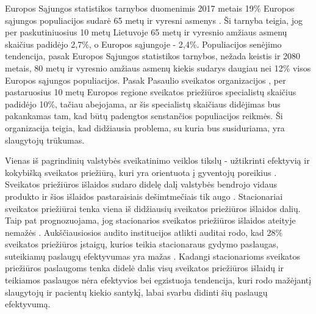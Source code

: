 
Europos Sąjungos statistikos tarnybos duomenimis 2017 metais 19\% Europos sąjungos populiacijos sudarė 65 metų ir vyresni asmenys \cite{Eurostat}. Ši tarnyba teigia, jog per paskutiniuosius 10 metų Lietuvoje 65 metų ir vyresnio amžiaus asmenų skaičius padidėjo 2,7\%, o Europos sąjungoje - 2,4\%. Populiacijos senėjimo tendencija, pasak Europos Sąjungos statistikos tarnybos, nežada keistis ir 2080 metais, 80 metų ir vyresnio amžiaus asmenų kiekis sudarys daugiau nei 12\% visos Europos sąjungos populiacijos. Pasak Pasaulio sveikatos organizacijos \cite{Organization2012}, per pastaruosius 10 metų Europos regione sveikatos priežiūros specialistų skaičius padidėjo 10\%, tačiau abejojama, ar šis specialistų skaičiaus didėjimas bus pakankamas tam, kad būtų padengtos senstančios populiacijos reikmės. Ši organizacija teigia, kad didžiausia problema, su kuria bus susiduriama, yra slaugytojų trūkumas.

Vienas iš pagrindinių valstybės sveikatinimo veiklos tikslų - užtikrinti efektyvią ir kokybišką sveikatos priežiūrą, kuri yra orientuota į gyventojų poreikius \cite{Ataskaita2018}. Sveikatos priežiūros išlaidos sudaro didelę dalį valstybės bendrojo vidaus produkto ir šios išlaidos pastaraisiais dešimtmečiais tik augo \cite{higiena}. Stacionariai sveikatos priežiūrai tenka viena iš didžiausių sveikatos priežiūros išlaidos dalių. Taip pat prognozuojama, jog stacionarios sveikatos priežiūros išlaidos ateityje nemažės \cite{higiena}. Aukščiausiosios audito institucijos atlikti auditai rodo, kad 28\% sveikatos priežiūros įstaigų, kurios teikia stacionaraus gydymo paslaugas, suteikiamų paslaugų efektyvumas yra mažas \cite{Ataskaita2018}. Kadangi stacionarioms sveikatos priežiūros paslaugoms tenka didelė dalis visų sveikatos priežiūros išlaidų ir teikiamos paslaugos nėra efektyvios bei egzistuoja tendencija, kuri rodo mažėjantį slaugytojų ir pacientų kiekio santykį, labai svarbu didinti šių paslaugų efektyvumą.

